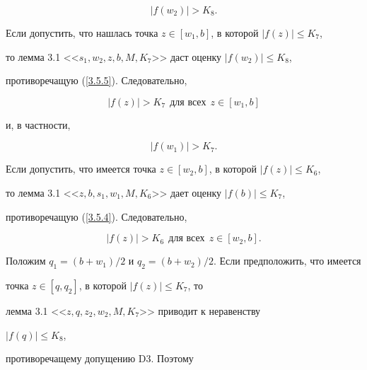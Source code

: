 \begin{pf}
\begin{equation}


\label{3.5.5}


|f(w_2)| > K_8.


\end{equation}


Если допустить, что нашлась точка $z\in [w_1, b]$, в которой $|f(z)|\leq K_7$, 


то лемма 3.1 <<$s_1, w_2, z, b, M, K_7$>> даст оценку $|f(w_2)| \leq K_8$, 


противоречащую (\ref{3.5.5}). Следовательно,


\begin{equation}


\label{3.5.6}


|f(z)| > K_7 \ \ \text{для всех} \ \ z\in [w_1,b]


\end{equation}


и, в частности,


\begin{equation}


\label{3.5.7}


|f(w_1)| > K_7.


\end{equation}


Если допустить, что имеется точка $z\in [w_2, b]$, в которой $|f(z)|\leq K_6$, 


то лемма 3.1 <<$z, b, s_1, w_1, M, K_6$>> дает оценку $|f(b)|\leq K_7$, 


противоречащую (\ref{3.5.4}). Следовательно,


\begin{equation}


\label{3.5.8}


|f(z)| > K_6 \ \ \text{для всех} \ \ z\in [w_2, b].


\end{equation}


Положим $q_1=(b+w_1)/2$ и $q_2 = (b+w_2)/2$. Если предположить, что имеется 


точка $z\in [q, q_2]$, в которой $|f(z)| \leq K_7$, то 


лемма 3.1 <<$z, q, z_2, w_2, M, K_7$>> приводит к неравенству 


$|f(q)| \leq K_8$, 


противоречащему допущению D3. Поэтому


\begin{equation}


\label{3.5.9}



\end{equation}
\end{pf}
